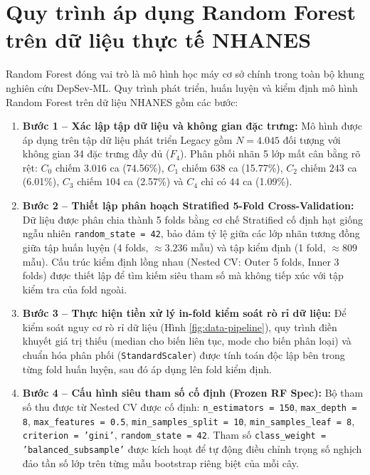 \section{Quy trình áp dụng Random Forest trên dữ liệu thực tế NHANES}
\label{sec:xay-dung-random-forest}

Random Forest đóng vai trò là mô hình học máy cơ sở chính trong toàn bộ khung nghiên cứu DepSev-ML. Quy trình phát triển, huấn luyện và kiểm định mô hình Random Forest trên dữ liệu NHANES gồm các bước:

\begin{enumerate}
    \item \textbf{Bước 1 -- Xác lập tập dữ liệu và không gian đặc trưng:} 
    Mô hình được áp dụng trên tập dữ liệu phát triển Legacy gồm $N = 4.045$ đối tượng với không gian 34 đặc trưng đầy đủ ($F_4$). Phân phối nhãn 5 lớp mất cân bằng rõ rệt: $C_0$ chiếm $3.016$ ca (74.56\%), $C_1$ chiếm $638$ ca (15.77\%), $C_2$ chiếm $243$ ca (6.01\%), $C_3$ chiếm $104$ ca (2.57\%) và $C_4$ chỉ có $44$ ca (1.09\%).
    
    \item \textbf{Bước 2 -- Thiết lập phân hoạch Stratified 5-Fold Cross-Validation:} 
    Dữ liệu được phân chia thành 5 folds bằng cơ chế Stratified cố định hạt giống ngẫu nhiên \texttt{random\_state = 42}, bảo đảm tỷ lệ giữa các lớp nhãn tương đồng giữa tập huấn luyện (4 folds, $\approx 3.236$ mẫu) và tập kiểm định (1 fold, $\approx 809$ mẫu). Cấu trúc kiểm định lồng nhau (Nested CV: Outer 5 folds, Inner 3 folds) được thiết lập để tìm kiếm siêu tham số mà không tiếp xúc với tập kiểm tra của fold ngoài.
    
    \item \textbf{Bước 3 -- Thực hiện tiền xử lý in-fold kiểm soát rò rỉ dữ liệu:} 
    Để kiểm soát nguy cơ rò rỉ dữ liệu (Hình \ref{fig:data-pipeline}), quy trình điền khuyết giá trị thiếu (median cho biến liên tục, mode cho biến phân loại) và chuẩn hóa phân phối (\texttt{StandardScaler}) được tính toán độc lập bên trong từng fold huấn luyện, sau đó áp dụng lên fold kiểm định.
    
    \item \textbf{Bước 4 -- Cấu hình siêu tham số cố định (Frozen RF Spec):} 
    Bộ tham số thu được từ Nested CV được cố định: \texttt{n\_estimators = 150}, \texttt{max\_depth = 8}, \texttt{max\_features = 0.5}, \texttt{min\_samples\_split = 10}, \texttt{min\_samples\_leaf = 8}, \texttt{criterion = 'gini'}, \texttt{random\_state = 42}. Tham số \texttt{class\_weight = 'balanced\_subsample'} được kích hoạt để tự động điều chỉnh trọng số nghịch đảo tần số lớp trên từng mẫu bootstrap riêng biệt của mỗi cây.
    

\end{enumerate}
